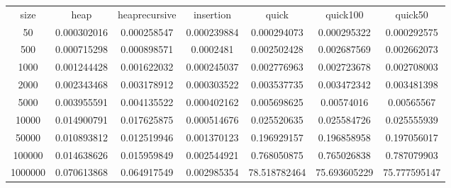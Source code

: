 \begin{table}
\begin{tabular}{ccccccc}
size & heap & heaprecursive & insertion & quick & quick100 & quick50 \\
50 & 0.000302016 & 0.000258547 & 0.000239884 & 0.000294073 & 0.000295322 & 0.000292575 \\
500 & 0.000715298 & 0.000898571 & 0.0002481 & 0.002502428 & 0.002687569 & 0.002662073 \\
1000 & 0.001244428 & 0.001622032 & 0.000245037 & 0.002776963 & 0.002723678 & 0.002708003 \\
2000 & 0.002343468 & 0.003178912 & 0.000303522 & 0.003537735 & 0.003472342 & 0.003481398 \\
5000 & 0.003955591 & 0.004135522 & 0.000402162 & 0.005698625 & 0.00574016 & 0.00565567 \\
10000 & 0.014900791 & 0.017625875 & 0.000514676 & 0.025520635 & 0.025584726 & 0.025555939 \\
50000 & 0.010893812 & 0.012519946 & 0.001370123 & 0.196929157 & 0.196858958 & 0.197056017 \\
100000 & 0.014638626 & 0.015959849 & 0.002544921 & 0.768050875 & 0.765026838 & 0.787079903 \\
1000000 & 0.070613868 & 0.064917549 & 0.002985354 & 78.518782464 & 75.693605229 & 75.777595147 \\
\end{tabular}
\end{table}
